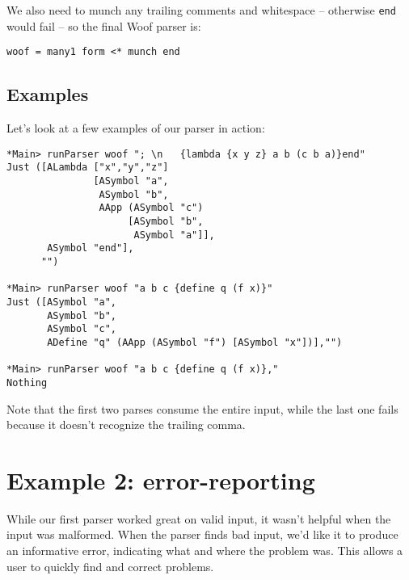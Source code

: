 \documentclass{tmr}
\begin{document}
We also need to munch any trailing comments and whitespace -- otherwise \verb+end+
would fail -- so the final Woof parser is:
\begin{verbatim}
woof = many1 form <* munch end
\end{verbatim}

\subsection{Examples}
Let's look at a few examples of our parser in action:
\begin{verbatim}
*Main> runParser woof "; \n   {lambda {x y z} a b (c b a)}end"
Just ([ALambda ["x","y","z"] 
               [ASymbol "a",
                ASymbol "b",
                AApp (ASymbol "c") 
                     [ASymbol "b",
                      ASymbol "a"]],
       ASymbol "end"],
      "")

*Main> runParser woof "a b c {define q (f x)}"
Just ([ASymbol "a",
       ASymbol "b",
       ASymbol "c",
       ADefine "q" (AApp (ASymbol "f") [ASymbol "x"])],"")

*Main> runParser woof "a b c {define q (f x)},"
Nothing
\end{verbatim}
Note that the first two parses consume the entire input, while the last one 
fails because it doesn't recognize the trailing comma.




\section{Example 2: error-reporting}
While our first parser worked great on valid input, it wasn't helpful
when the input was malformed.  When the parser finds bad input, we'd like it to 
produce an informative error, indicating what and where the problem was.  
This allows a user to quickly find and correct problems.
\end{document}
